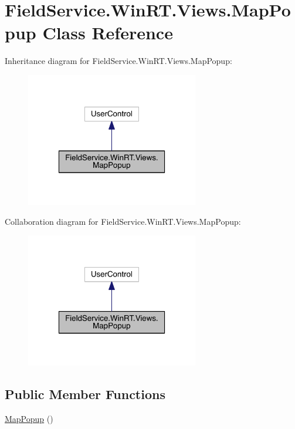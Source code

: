 \hypertarget{class_field_service_1_1_win_r_t_1_1_views_1_1_map_popup}{\section{Field\+Service.\+Win\+R\+T.\+Views.\+Map\+Popup Class Reference}
\label{class_field_service_1_1_win_r_t_1_1_views_1_1_map_popup}
}


Inheritance diagram for Field\+Service.\+Win\+R\+T.\+Views.\+Map\+Popup\+:
\nopagebreak
\begin{figure}[H]
\begin{center}
\leavevmode
\includegraphics[width=214pt]{class_field_service_1_1_win_r_t_1_1_views_1_1_map_popup__inherit__graph}
\end{center}
\end{figure}


Collaboration diagram for Field\+Service.\+Win\+R\+T.\+Views.\+Map\+Popup\+:
\nopagebreak
\begin{figure}[H]
\begin{center}
\leavevmode
\includegraphics[width=214pt]{class_field_service_1_1_win_r_t_1_1_views_1_1_map_popup__coll__graph}
\end{center}
\end{figure}
\subsection*{Public Member Functions}
\begin{DoxyCompactItemize}
\item 
\hyperlink{class_field_service_1_1_win_r_t_1_1_views_1_1_map_popup_a1d5202796ac5b2a8b9de09b10fd19686}{Map\+Popup} ()
\end{DoxyCompactItemize}


